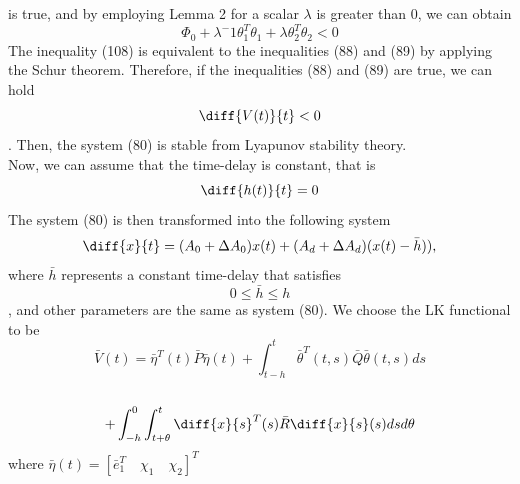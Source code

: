 \documentclass[journal]{IEEEtran}
\begin{document}
 is true, and by employing Lemma 2 for a scalar $\lambda$ is greater than 0, we can obtain 
\begin{equation}
\Phi_0 + \lambda^-1\theta^{T}_{1}\theta_1 + \lambda\theta^{T}_{2}\theta_2 < 0
\end{equation}
The inequality (108) is equivalent to the inequalities (88) and (89) by applying the Schur theorem. Therefore, if the inequalities (88) and (89) are true, we can hold 
\begin{equation}
\diff{V(t)}{t} < 0
\end{equation}
. Then, the system (80) is stable from Lyapunov stability theory. 
\\
Now, we can assume that the time-delay is constant, that is
\begin{equation}
\diff{h(t)}{t} = 0
\end{equation}
The system (80) is then transformed into the following system 
\begin{equation}
 \diff{x}{t}=(A_0 + \Delta A_0)x(t) + (A_d + \Delta A_d)(x(t)-\bar{h})),
\end{equation}
where $\bar{h}$ represents a constant time-delay that satisfies
\begin{equation}
0  \leqslant \bar{h} \leqslant h
\end{equation}
, and other parameters are the same as system (80). We choose the LK functional to be
\begin{equation}
\bar{V}(t) = \bar{\eta}^T(t)\bar{P} \bar{\eta}(t) + \int^{t}_{t-h}\bar{\theta}^T(t,s)\bar{Q}\bar{\theta}(t,s)ds 
\end{equation}
\\
\begin{equation}
+ \int^{0}_{-h}\int^{t}_{t + \theta}\diff{x}{s}^T(s)\bar{R}\diff{x}{s}(s)dsd\theta
\end{equation}
where 
$\bar{\eta}(t) = [\bar{e}^{T}_{1} \quad \chi_1 \quad  \chi_2]^T$
 
\end{document}
